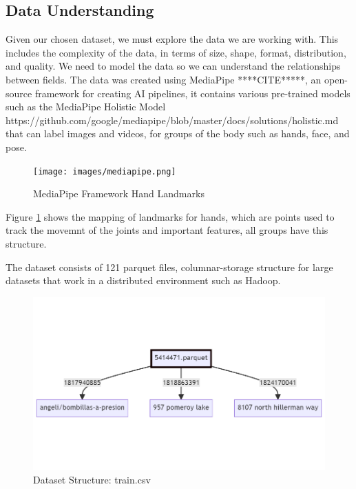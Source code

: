 \documentclass[preprint,12pt,review,authoryear]{elsarticle}
\begin{document}
\subsection{Data Understanding}

Given our chosen dataset, we must explore the data we are working with. This includes the complexity of the data, in terms of size, shape, format, distribution, and quality. We need to model the data so we can understand the relationships between fields. The data was created using MediaPipe ****CITE*****, an open-source framework for creating AI pipelines, it contains various pre-trained models such as the MediaPipe Holistic Model https://github.com/google/mediapipe/blob/master/docs/solutions/holistic.md that can label images and videos, for groups of the body such as hands, face, and pose.

\begin{figure}[h]
    \centering
    \texttt{[image: images/mediapipe.png]}
    \caption{MediaPipe Framework Hand Landmarks \cite{IMAGE}}
    \label{fig:MediaPipe Framework}
\end{figure}

Figure \ref{fig:MediaPipe Framework} shows the mapping of landmarks for hands, which are points used to track the movemnt of the joints and important features, all groups have this structure.

The dataset consists of 121 parquet files, columnar-storage structure for large datasets that work in a distributed environment such as Hadoop. 

\begin{figure}[h]
    \centering
    \includegraphics[width=1\textwidth]{images/parquet_structure_1.png}
    \caption{Dataset Structure: train.csv}
    \label{fig:Dataset Structure}
\end{figure}
\end{document}

